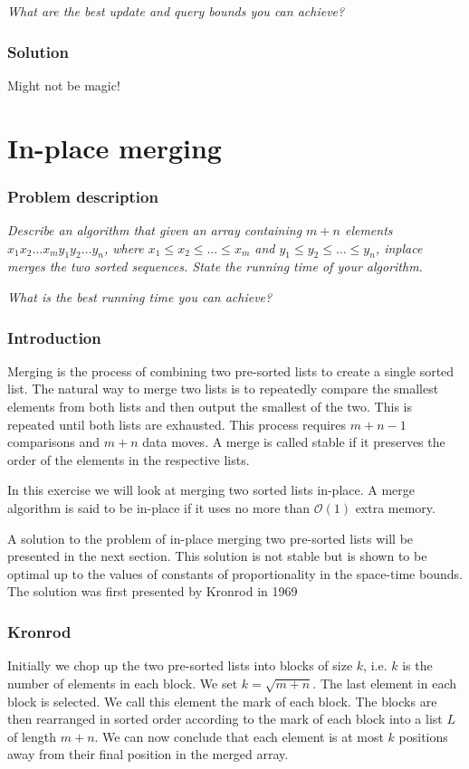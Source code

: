 \documentclass[a4paper,oneside,article,11pt]{memoir}
\begin{document}
\textit{What are the best update and query bounds you can achieve?}

\subsection{Solution}
Might not be magic!

\chapter{In-place merging}
\label{chp:inplace}
\subsection{Problem description}
\textit{Describe an algorithm that given an array containing $m+n$ elements $x_1x_2\dots x_m y_1y_2\dots y_n$, where $x_1\leq x_2\leq \dots \leq x_m$ and $y_1\leq y_2\leq \dots \leq y_n$, inplace merges the two sorted sequences. State the running time of your algorithm.}

\textit{What is the best running time you can achieve?}

\subsection{Introduction}
Merging is the process of combining two pre-sorted lists to create a single sorted list. The natural way to merge two lists is to repeatedly compare the smallest elements from both lists and then output the smallest of the two. This is repeated until both lists are exhausted. This process requires $m+n-1$ comparisons and $m+n$ data moves. A merge is called stable if it preserves the order of the elements in the respective lists.

In this exercise we will look at merging two sorted lists in-place. A merge algorithm is said to be in-place if it uses no more than $\mathcal{O}(1)$ extra memory.

A solution to the problem of in-place merging two pre-sorted lists will be presented in the next section. This solution is not stable but is shown to be optimal up to the values of constants of proportionality in the space-time bounds. The solution was first presented by Kronrod in 1969 \cite{Kronrod}

\subsection{Kronrod}
Initially we chop up the two pre-sorted lists into blocks of size $k$, i.e. $k$ is the number of elements in each block. We set $k =\sqrt{m+n}$. The last element in each block is selected. We call this element the mark of each block. The blocks are then rearranged in sorted order according to the mark of each block into a list $L$ of length $m+n$. We can now conclude that each element is at most $k$ positions away from their final position in the merged array.
\end{document}

